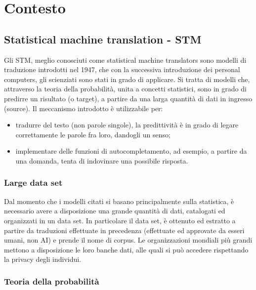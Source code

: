 \clearpage{\pagestyle{empty}\cleardoublepage}
\chapter{Contesto}                %
\lhead[\fancyplain{}{\bfseries\thepage}]{\fancyplain{}{\bfseries\rightmark}}


\section{Statistical machine translation - STM}

Gli STM, meglio conosciuti come statistical machine translators sono modelli di traduzione introdotti nel 1947, che con la successiva introduzione dei personal computers, gli scienziati sono stati in grado di applicare. Si tratta di modelli che, attraverso la teoria della probabilità, unita a concetti statistici, sono in grado di predirre un risultato (o target), a partire da una larga quantità di dati in ingresso (source). Il meccanismo introdotto è utilizzabile per:
\begin{itemize}
	\item tradurre del testo (non parole singole), la predittività è in grado di legare correttamente le parole fra loro, dandogli un senso;
	\item implementare delle funzioni di autocompletamento, ad esempio, a partire da una domanda, tenta di indovinare una possibile risposta.
\end{itemize}

\subsection{Large data set}

Dal momento che i modelli citati si basano principalmente sulla statistica, è necessario avere a disposizione una grande quantità di dati, catalogati ed organizzati in un data set.
In particolare il data set, è ottenuto ed estratto a partire da traduzioni effettuate in precedenza (effettuate ed approvate da esseri umani, non AI) e prende il nome di corpus.
Le organizzazioni mondiali più grandi mettono a disposizione le loro banche dati, alle quali si può accedere rispettando la privacy degli individui.  


\subsection{Teoria della probabilità}


